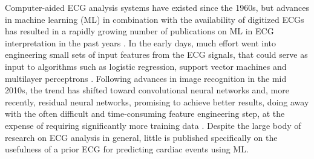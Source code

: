 \documentclass[preprint]{elsarticle}
\begin{document}
Computer-aided ECG analysis systems have existed since the 1960s, but advances in machine learning (ML) in combination with the availability of digitized ECGs has resulted in a rapidly growing number of publications on ML in ECG interpretation in the past years \citep{pipberger1961}. In the early days, much effort went into engineering small sets of input features from the ECG signals, that could serve as input to algorithms such as logistic regression, support vector machines and multilayer perceptrons \citep{ansari2017}. Following advances in image recognition in the mid 2010s, the trend has shifted toward convolutional neural networks and, more recently, residual neural networks, promising to achieve better results, doing away with the often difficult and time-consuming feature engineering step, at the expense of requiring significantly more training data \citep{hong2020, liu2021, petmezas2022, chennouf2023, xiao2023, boulif2023}. Despite the large body of research on ECG analysis in general, little is published specifically on the usefulness of a prior ECG for predicting cardiac events using ML. 


\end{document}
